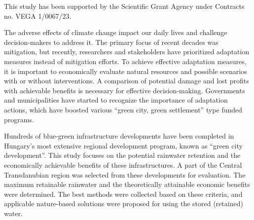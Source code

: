This study has been supported by the Scientific Grant Agency under Contracts no. VEGA 1/0067/23.
\newpage{}
{}
\begin{flushleft}





\end{flushleft}

\noindent

The adverse effects of climate change impact our daily lives and challenge decision-makers to address it. The primary focus of recent decades was mitigation, but recently, researchers and stakeholders have prioritized adaptation measures instead of mitigation efforts. To achieve effective adaptation measures, it is important to economically evaluate natural resources and possible scenarios with or without interventions. A comparison of potential damage and lost profits with achievable benefits is necessary for effective decision-making. Governments and municipalities have started to recognize the importance of adaptation actions, which have boosted various ``green city, green settlement'' type funded programs.

Hundreds of blue-green infrastructure developments have been completed in Hungary's most extensive regional development program, known as ``green city development''. This study focuses on the potential rainwater retention and the economically achievable benefits of these infrastructures. A part of the Central Transdanubian region was selected from these developments for evaluation. The maximum retainable rainwater and the theoretically attainable economic benefits were determined. The best methods were collected based on these criteria, and applicable nature-based solutions were proposed for using the stored (retained) water. 

